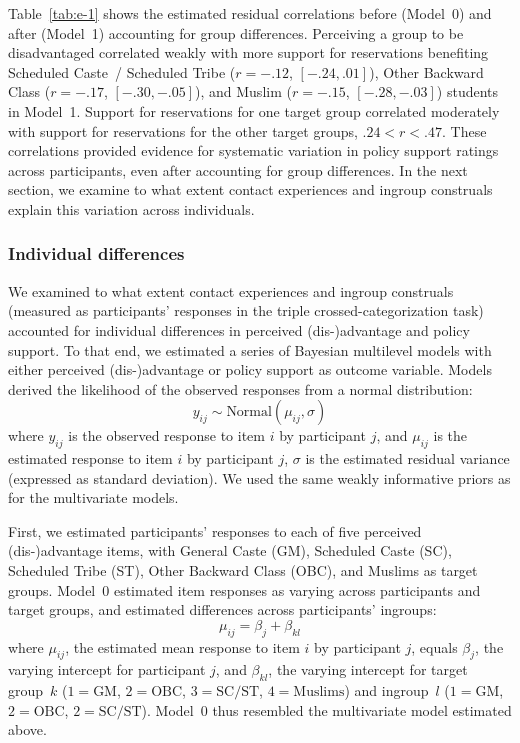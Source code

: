 \documentclass[12pt, a4paper]{article}
\begin{document}
Table~\ref{tab:e-1} shows the estimated residual correlations before (Model~0) and after (Model~1) accounting for group differences. Perceiving a group to be disadvantaged correlated weakly with more support for reservations benefiting Scheduled Caste~/ Scheduled Tribe ($r = -.12 $, $[-.24,.01]$), Other Backward Class ($r = -.17$, $[-.30,-.05]$), and Muslim ($r = -.15$, $[-.28,-.03]$) students in Model~1. Support for reservations for one target group correlated moderately with support for reservations for the other target groups, $.24 < r < .47$. These correlations provided evidence for systematic variation in policy support ratings across participants, even after accounting for group differences. In the next section, we examine to what extent contact experiences and ingroup construals explain this variation across individuals.

\subsubsection{Individual differences}

We examined to what extent contact experiences and ingroup construals (measured as participants' responses in the triple crossed-categorization task) accounted for individual differences in perceived (dis-)advantage and policy support. To that end, we estimated a series of Bayesian multilevel models with either perceived (dis-)advantage or policy support as outcome variable. Models derived the likelihood of the observed responses from a normal distribution: $$ y_{ij} \sim \text{Normal} (\mu_{ij}, \sigma) $$ where $y_{ij}$ is the observed response to item $i$ by participant $j$, and $\mu_{ij}$ is the estimated response to item $i$ by participant $j$, $\sigma$ is the estimated residual variance (expressed as standard deviation). We used the same weakly informative priors as for the multivariate models.

First, we estimated participants' responses to each of five perceived (dis-)advantage items, with General Caste (GM), Scheduled Caste (SC), Scheduled Tribe (ST), Other Backward Class (OBC), and Muslims as target groups. Model~0 estimated item responses as varying across participants and target groups, and estimated differences across participants' ingroups: $$ \mu_{ij} = \beta_{j} + \beta_{kl} $$ where $\mu_{ij}$, the estimated mean response to item $i$ by participant $j$, equals $\beta_j$, the varying intercept for participant $j$, and $\beta_{kl}$, the varying intercept for target group~$k$ ($1 = \text{GM}$, $2 = \text{OBC}$, $3 = \text{SC/ST}$, $4 = \text{Muslims}$) and ingroup~$l$ ($1 = \text{GM}$, $2 = \text{OBC}$, $2 = \text{SC/ST}$). Model~0 thus resembled the multivariate model estimated above. 
\end{document}
